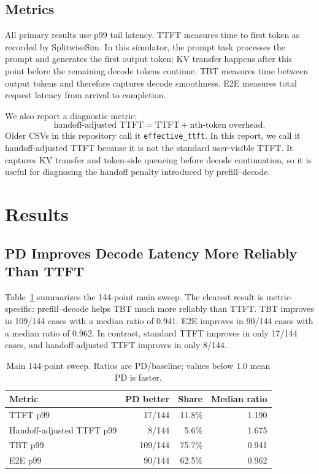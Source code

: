 \documentclass[10pt]{article}
\newcommand{\pd}{prefill--decode}
\begin{document}
\subsection{Metrics}
All primary results use p99 tail latency. TTFT measures time to first token as recorded by SplitwiseSim. In this simulator, the prompt task processes the prompt and generates the first output token; KV transfer happens after this point before the remaining decode tokens continue. TBT measures time between output tokens and therefore captures decode smoothness. E2E measures total request latency from arrival to completion.

We also report a diagnostic metric:
\[
\text{handoff-adjusted TTFT} = \text{TTFT} + \text{nth-token overhead}.
\]
Older CSVs in this repository call it \texttt{effective\_ttft}. In this report, we call it handoff-adjusted TTFT because it is not the standard user-visible TTFT. It captures KV transfer and token-side queueing before decode continuation, so it is useful for diagnosing the handoff penalty introduced by \pd{}.

\section{Results}
\subsection{PD Improves Decode Latency More Reliably Than TTFT}
Table~\ref{tab:main-summary} summarizes the 144-point main sweep. The clearest result is metric-specific: \pd{} helps TBT much more reliably than TTFT. TBT improves in 109/144 cases with a median ratio of 0.941. E2E improves in 90/144 cases with a median ratio of 0.962. In contrast, standard TTFT improves in only 17/144 cases, and handoff-adjusted TTFT improves in only 8/144.

\begin{table}[t]
\centering
\small
\caption{Main 144-point sweep. Ratios are PD/baseline; values below 1.0 mean PD is faster.}
\label{tab:main-summary}
\begin{tabular}{lrrr}
\toprule
Metric & PD better & Share & Median ratio \\
\midrule
TTFT p99 & 17/144 & 11.8\% & 1.190 \\
Handoff-adjusted TTFT p99 & 8/144 & 5.6\% & 1.675 \\
TBT p99 & 109/144 & 75.7\% & 0.941 \\
E2E p99 & 90/144 & 62.5\% & 0.962 \\
\bottomrule
\end{tabular}
\end{table}
\end{document}
